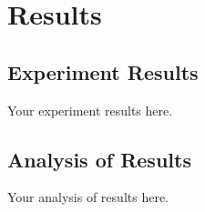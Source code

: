 \chapter{Results}
\section{Experiment Results}
Your experiment results here.
\section{Analysis of Results}
Your analysis of results here.
